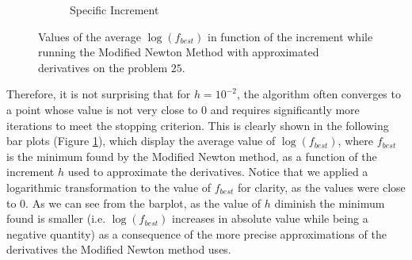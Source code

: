 \begin{figure}[htbp]
\begin{subfigure}[t]{0.45\textwidth}
        \caption{Specific Increment }
    \end{subfigure}
    \caption{ \small Values of the average $\log(f_{best})$ in function of the increment while running the Modified Newton Method with approximated derivatives on the problem $25$.}
    \label{logfbest_difffinite25}
\end{figure}

Therefore, it is not surprising that for $h = 10^{-2}$, the algorithm often converges to a point whose value is not very close to $0$ and requires significantly more iterations to meet the stopping criterion.
This is clearly shown in the following bar plots (Figure \ref{logfbest_difffinite25}), which display the average value of $\log (f_{best})$, where $f_{best}$ is the minimum found by the Modified Newton method, as a function of the increment $h$ used to approximate the derivatives. Notice that we applied a logarithmic transformation to the value of $f_{best}$ for clarity, as the values were close to $0$.
As we can see from the barplot, as the value of $h$ diminish the minimum found is smaller (i.e. $\log(f_{best})$ increases in absolute value while being a negative quantity) as a consequence of the more precise approximations of the derivatives the Modified Newton method uses.


